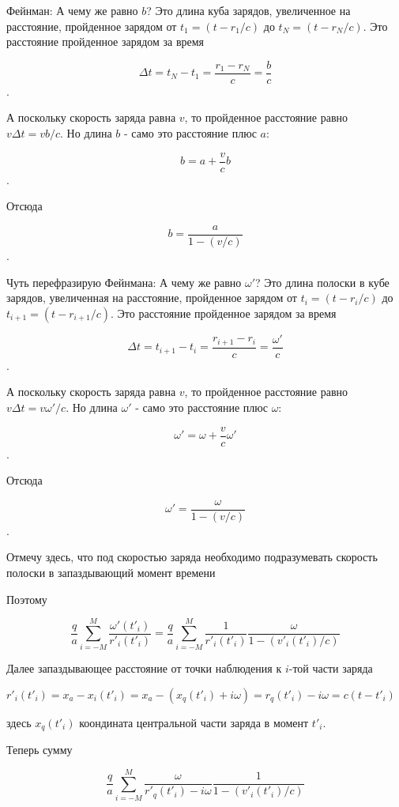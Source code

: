 \documentclass{article}
\begin{document}
Фейнман: А чему же равно $b$? Это длина куба зарядов, увеличенное на расстояние, пройденное зарядом от $t_1 = (t-r_1/c)$ до $t_N = (t-r_N/c)$. Это расстояние пройденное зарядом за время 

$$\Delta t = t_N - t_1 = \frac{r_1-r_N}{c}= \frac{b}{c}$$.

А поскольку скорость заряда равна $v$, то пройденное расстояние равно $v \Delta t = v b / c$. Но длина $b$ - само это расстояние плюс $a$:

$$b = a + \frac{v}{c}b$$.

Отсюда 

$$b = \frac{a}{1- (v/c)}$$.

Чуть перефразирую Фейнмана: А чему же равно $\omega'$? Это длина полоски в кубе зарядов, увеличенная на расстояние, пройденное зарядом от $t_{i} = (t-r_{i}/c)$ до $t_{i+1} = (t-r_{i+1}/c)$. Это расстояние пройденное зарядом за время 

$$\Delta t = t_{i+1} - t_{i} = \frac{r_{i+1}-r_{i}}{c}= \frac{\omega'}{c}$$.

А поскольку скорость заряда равна $v$, то пройденное расстояние равно $v \Delta t = v \omega' / c$. Но длина $\omega'$ - само это расстояние плюс $\omega$:

$$\omega' = \omega + \frac{v}{c}\omega'$$.

Отсюда 

$$\omega' = \frac{\omega}{1- (v/c)}$$.

Отмечу здесь, что под скоростью заряда необходимо подразумевать скорость полоски в запаздывающий момент времени

Поэтому

$$ \frac{q}{a}\sum\limits_{i=-M}^M \frac{\omega'(t'_{i})}{r'_{i}(t'_{i})}= \frac{q}{a}\sum\limits_{i=-M}^M \frac{1}{r'_{i}(t'_{i})} \frac{\omega}{1- (v'_{i}(t'_{i})/c)}$$

Далее запаздывающее расстояние от точки наблюдения к $i$-той части заряда

$r'_{i}\left(t'_{i}\right)=x_a-x_i\left(t'_{i}\right)=x_a-\left(x_q\left(t'_{i}\right)+i \omega\right)=r_q\left(t'_{i}\right)-i \omega=c\left(t - t'_{i}\right)$

здесь $x_q\left(t'_{i}\right)$ коондината центральной части заряда в момент $t'_{i}$.


Теперь сумму

$$\frac{q}{a}\sum\limits_{i=-M}^M \frac{\omega }{r'_{q}(t'_{i})-i \omega}\frac{1}{1- (v'_{i}(t'_{i})/c)}$$

\end{document}
